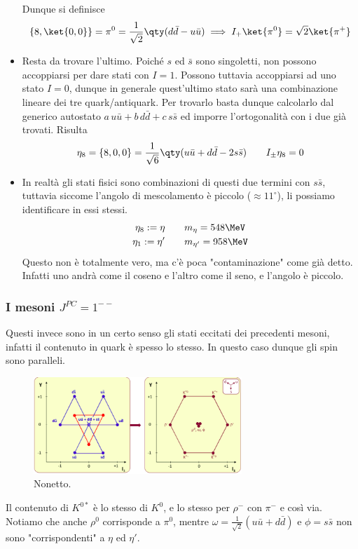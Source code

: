 \begin{itemize}
\begin{equation*}
  \end{equation*}
  Dunque si definisce
  \begin{equation*}
  \{8,\ket{0,0} \}=\pi^0=\frac1{\sqrt2}\qty(d\bar d-u\bar u)\implies I_+\ket{\pi^0}=\sqrt2\ket{\pi^+}
  \end{equation*}
  \item Resta da trovare l'ultimo. Poiché $s$ ed $\bar s$ sono singoletti, non possono accoppiarsi per dare stati con $I=1$. Possono tuttavia accoppiarsi ad uno stato $I=0$, dunque in generale quest'ultimo stato sarà una combinazione lineare dei tre quark/antiquark. Per trovarlo basta dunque calcolarlo dal generico autostato $a\,u\bar u+ b\, d\bar d + c\,s\bar s$ ed imporre l'ortogonalità con i due già trovati. Risulta
  \begin{equation*}
  \eta_8=\{8,{0,0}\}=\frac1{\sqrt6}\qty(u\bar u+d\bar d-2s\bar s)\qquad I_\pm\eta_8=0
  \end{equation*}
  \item In realtà gli stati fisici sono combinazioni di questi due termini con $s\bar s$, tuttavia siccome l'angolo di mescolamento è piccolo ($\approx11^\circ$), li possiamo identificare in essi stessi.
  \begin{gather*}
  \eta_8:=\eta\qquad m_\eta=548\MeV\\
  \eta_1:=\eta'\qquad m_{\eta'}=958\MeV
  \end{gather*}
  Questo non è totalmente vero, ma c'è poca "contaminazione" come già detto. Infatti uno andrà come il coseno e l'altro come il seno, e l'angolo è piccolo.
  \end{itemize}
\subsubsection{I mesoni $J^{PC}=1^{--}$}
Questi invece sono in un certo senso gli stati eccitati dei precedenti mesoni, infatti il contenuto in quark è spesso lo stesso. In questo caso dunque gli spin sono paralleli.
\begin{figure}[H]
    \centering
    \includegraphics[width=0.7\textwidth]{immagini/fig_vector_mesons.png}
    \caption{Nonetto.}
\end{figure}
Il contenuto di $K^{0*}$ è lo stesso di $K^0$, e lo stesso per $\rho^-$ con $\pi^-$ e così via. Notiamo che anche $\rho^0$ corrisponde a $\pi^0$, mentre $\omega=\frac1{\sqrt2}(u\bar u+d\bar d)$ e $\phi=s\bar s$ non sono "corrispondenti" a $\eta$ ed $\eta'$.
